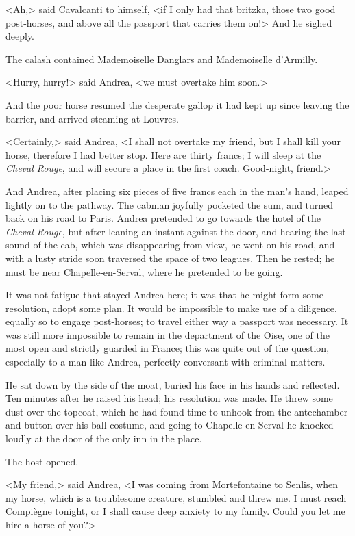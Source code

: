  <Ah,> said Cavalcanti to himself, <if I only had that britzka, those two good post-horses, and above all the passport that carries them on!> And he sighed deeply. 

 The calash contained Mademoiselle Danglars and Mademoiselle d'Armilly. 

 <Hurry, hurry!> said Andrea, <we must overtake him soon.> 

 And the poor horse resumed the desperate gallop it had kept up since leaving the barrier, and arrived steaming at Louvres. 

 <Certainly,> said Andrea, <I shall not overtake my friend, but I shall kill your horse, therefore I had better stop. Here are thirty francs; I will sleep at the \textit{Cheval Rouge}, and will secure a place in the first coach. Good-night, friend.> 

 And Andrea, after placing six pieces of five francs each in the man's hand, leaped lightly on to the pathway. The cabman joyfully pocketed the sum, and turned back on his road to Paris. Andrea pretended to go towards the hotel of the \textit{Cheval Rouge}, but after leaning an instant against the door, and hearing the last sound of the cab, which was disappearing from view, he went on his road, and with a lusty stride soon traversed the space of two leagues. Then he rested; he must be near Chapelle-en-Serval, where he pretended to be going. 

 It was not fatigue that stayed Andrea here; it was that he might form some resolution, adopt some plan. It would be impossible to make use of a diligence, equally so to engage post-horses; to travel either way a passport was necessary. It was still more impossible to remain in the department of the Oise, one of the most open and strictly guarded in France; this was quite out of the question, especially to a man like Andrea, perfectly conversant with criminal matters. 

 He sat down by the side of the moat, buried his face in his hands and reflected. Ten minutes after he raised his head; his resolution was made. He threw some dust over the topcoat, which he had found time to unhook from the antechamber and button over his ball costume, and going to Chapelle-en-Serval he knocked loudly at the door of the only inn in the place. 

 The host opened. 

 <My friend,> said Andrea, <I was coming from Mortefontaine to Senlis, when my horse, which is a troublesome creature, stumbled and threw me. I must reach Compiègne tonight, or I shall cause deep anxiety to my family. Could you let me hire a horse of you?> 

